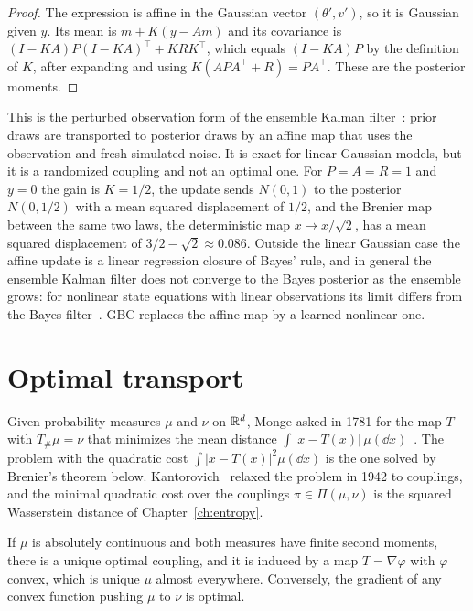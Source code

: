\begin{proof}
The expression is affine in the Gaussian vector $(\theta',v')$, so it is Gaussian given $y$. Its mean is $m+K(y-Am)$ and its covariance is $(I-KA)P(I-KA)^\top+KRK^\top$, which equals $(I-KA)P$ by the definition of $K$, after expanding and using $K(APA^\top+R) = PA^\top$. These are the posterior moments.
\end{proof}

This is the perturbed observation form of the ensemble Kalman filter~\cite{evensen1994,burgers1998}: prior draws are transported to posterior draws by an affine map that uses the observation and fresh simulated noise. It is exact for linear Gaussian models, but it is a randomized coupling and not an optimal one. For $P = A = R = 1$ and $y = 0$ the gain is $K = 1/2$, the update sends $N(0,1)$ to the posterior $N(0,1/2)$ with a mean squared displacement of $1/2$, and the Brenier map between the same two laws, the deterministic map $x\mapsto x/\sqrt2$, has a mean squared displacement of $3/2-\sqrt2\approx0.086$. Outside the linear Gaussian case the affine update is a linear regression closure of Bayes' rule, and in general the ensemble Kalman filter does not converge to the Bayes posterior as the ensemble grows: for nonlinear state equations with linear observations its limit differs from the Bayes filter~\cite{legland2011}. GBC replaces the affine map by a learned nonlinear one.

\section{Optimal transport}

Given probability measures $\mu$ and $\nu$ on $\mathbb{R}^d$, Monge asked in 1781 for the map $T$ with $T_\#\mu = \nu$ that minimizes the mean distance $\int|x-T(x)|\,\mu(\dd x)$~\cite[Chapter~3]{villani2009}. The problem with the quadratic cost $\int|x-T(x)|^2\mu(\dd x)$ is the one solved by Brenier's theorem below. Kantorovich~\cite{kantorovich1942} relaxed the problem in 1942 to couplings, and the minimal quadratic cost over the couplings $\pi\in\Pi(\mu,\nu)$ is the squared Wasserstein distance of Chapter~\ref{ch:entropy}.

\begin{theorem}[Brenier]
\label{thm:brenier}
If $\mu$ is absolutely continuous and both measures have finite second moments, there is a unique optimal coupling, and it is induced by a map $T = \nabla\varphi$ with $\varphi$ convex, which is unique $\mu$ almost everywhere. Conversely, the gradient of any convex function pushing $\mu$ to $\nu$ is optimal.
\end{theorem}

